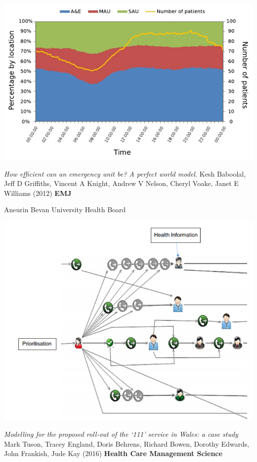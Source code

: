 \documentclass{beamer}
\begin{document}
\begin{frame}

\begin{center}
	\includegraphics[width=.8\textwidth]{./img/eu_work.png}
\end{center}

\textit{How efficient can an emergency unit be? A perfect world model.}
Kesh Baboolal, Jeff D Griffiths, Vincent A Knight, Andrew V Nelson, Cheryl Voake, Janet E Williams (2012) \textbf{EMJ}
\end{frame}

	\begin{frame}
		\begin{center}
			\Huge
			Aneurin Bevan University Health Board
		\end{center}
	\end{frame}

	\begin{frame}
\begin{center}
	\includegraphics[width=.7\textwidth]{./img/111_work.png}
\end{center}

\textit{Modelling for the proposed roll-out of the ‘111’ service in Wales:
a case study} Mark Tuson,  Tracey England, Doris Behrens, Richard Bowen,
Dorothy Edwards, John Frankish, Jude Kay (2016) \textbf{Health Care Management Science}
	\end{frame}
\end{document}
